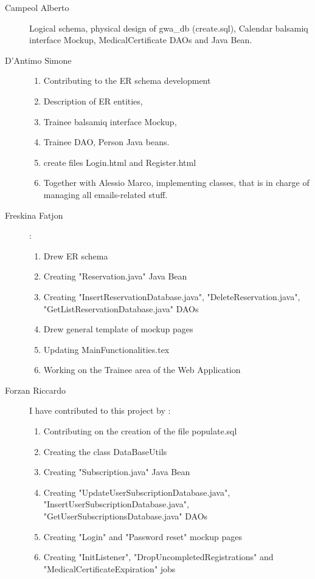 \begin{description}
	\item[Campeol Alberto] Logical schema, physical design of gwa\_db (create.sql), Calendar balsamiq interface Mockup, MedicalCertificate DAOs and Java Bean.
	\item[D'Antimo Simone] 
	\begin{enumerate}
		\item Contributing to the ER schema development
		\item Description of ER entities,
		\item Trainee balsamiq interface Mockup,
		\item Trainee DAO, Person Java beans.
		\item create files Login.html and Register.html  
		\item Together with Alessio Marco, implementing classes, that is in charge of managing all emails-related stuff.
	\end{enumerate}
	\item[Freskina Fatjon] :
	\begin{enumerate}
		\item Drew ER schema 
		\item Creating "Reservation.java" Java Bean 
		\item Creating "InsertReservationDatabase.java", "DeleteReservation.java", "GetListReservationDatabase.java" DAOs
		\item Drew general template of mockup pages 
		\item Updating MainFunctionalities.tex
		\item Working on the Trainee area of the Web Application
	\end{enumerate} 
	
	\item[Forzan Riccardo] I have contributed to this project by :
	\begin{enumerate}
		\item Contributing on the creation of the file populate.sql
		\item Creating the class DataBaseUtils
		\item Creating "Subscription.java" Java Bean
		\item Creating "UpdateUserSubscriptionDatabase.java", "InsertUserSubscriptionDatabase.java", "GetUserSubscriptionsDatabase.java" DAOs
		\item Creating "Login" and "Password reset" mockup pages
		\item Creating "InitListener", "DropUncompletedRegistrations" and "MedicalCertificateExpiration" jobs
	\end{enumerate}
	

\end{description}
